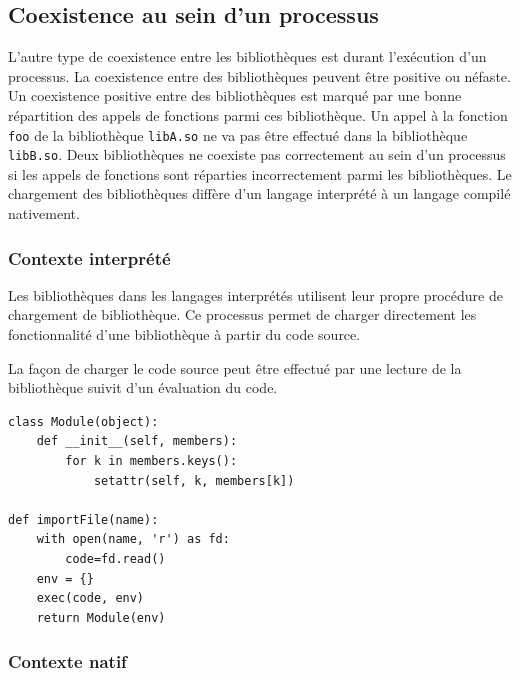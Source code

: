 


\subsection{Coexistence au sein d'un processus}
L'autre type de coexistence entre les bibliothèques est durant l'exécution d'un
processus.  La coexistence entre des bibliothèques peuvent être positive ou
néfaste.  Un coexistence positive entre des bibliothèques est marqué par une
bonne répartition des appels de fonctions parmi ces bibliothèque.  Un appel à
la fonction \verb|foo| de la bibliothèque \verb|libA.so| ne va pas être
effectué dans la bibliothèque \verb|libB.so|. Deux bibliothèques ne coexiste
pas correctement au sein d'un processus si les appels de fonctions sont
réparties incorrectement parmi les bibliothèques. Le chargement des bibliothèques
diffère d'un langage interprété à un langage compilé nativement.

\subsubsection{Contexte interprété}
Les bibliothèques dans les langages interprétés utilisent leur propre procédure
de chargement de bibliothèque. Ce processus permet de charger directement les
fonctionnalité d'une bibliothèque à partir du code source.

La façon de charger le code source peut être effectué par une lecture de la
bibliothèque suivit d'un évaluation du code.

\begin{verbatim}
class Module(object):
    def __init__(self, members):
        for k in members.keys():
            setattr(self, k, members[k])

def importFile(name):
    with open(name, 'r') as fd:
        code=fd.read()
    env = {}
    exec(code, env)
    return Module(env)

\end{verbatim}

\subsubsection{Contexte natif}


